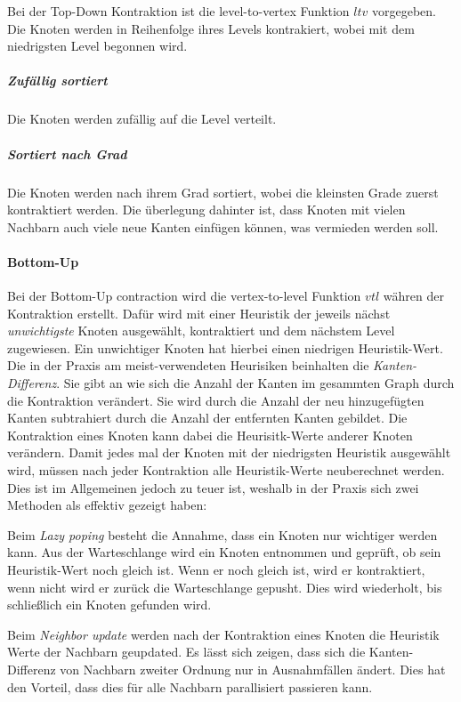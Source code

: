 Bei der Top-Down Kontraktion ist die level-to-vertex Funktion ${ltv}$ vorgegeben.
Die Knoten werden in Reihenfolge ihres Levels kontrakiert, wobei mit dem niedrigsten Level begonnen wird.

\subparagraph{Zufällig sortiert}
Die Knoten werden zufällig auf die Level verteilt. 

\subparagraph{Sortiert nach Grad}
Die Knoten werden nach ihrem Grad sortiert, wobei die kleinsten Grade zuerst kontraktiert werden.
Die überlegung dahinter ist, dass Knoten mit vielen Nachbarn auch viele neue Kanten einfügen können, was vermieden werden soll.


\paragraph{Bottom-Up}

Bei der Bottom-Up contraction wird die vertex-to-level Funktion ${vtl}$ währen der Kontraktion erstellt.
Dafür wird mit einer Heuristik der jeweils nächst \emph{unwichtigste} Knoten ausgewählt, kontraktiert und dem nächstem Level zugewiesen.
Ein unwichtiger Knoten hat hierbei einen niedrigen Heuristik-Wert.
Die in der Praxis am meist-verwendeten Heurisiken beinhalten die \emph{Kanten-Differenz}.
Sie gibt an wie sich die Anzahl der Kanten im gesammten Graph durch die Kontraktion verändert.
Sie wird durch die Anzahl der neu hinzugefügten Kanten subtrahiert durch die Anzahl der entfernten Kanten gebildet.
Die Kontraktion eines Knoten kann dabei die Heurisitk-Werte anderer Knoten verändern.
Damit jedes mal der Knoten mit der niedrigsten Heuristik ausgewählt wird, müssen nach jeder Kontraktion alle Heuristik-Werte neuberechnet werden.
Dies ist im Allgemeinen jedoch zu teuer ist, weshalb in der Praxis sich zwei Methoden als effektiv gezeigt haben:

Beim \emph{Lazy poping} besteht die Annahme, dass ein Knoten nur wichtiger werden kann.
Aus der Warteschlange wird ein Knoten entnommen und geprüft, ob sein Heuristik-Wert noch gleich ist.
Wenn er noch gleich ist, wird er kontraktiert, wenn nicht wird er zurück die Warteschlange gepusht.
Dies wird wiederholt, bis schließlich ein Knoten gefunden wird.

Beim \emph{Neighbor update} werden nach der Kontraktion eines Knoten die Heuristik Werte der Nachbarn geupdated.
Es lässt sich zeigen, dass sich die Kanten-Differenz von Nachbarn zweiter Ordnung nur in Ausnahmfällen ändert. 
Dies hat den Vorteil, dass dies für alle Nachbarn parallisiert passieren kann.


